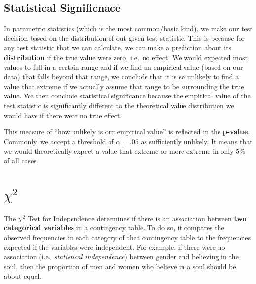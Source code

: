 \documentclass[
]{book}
\newenvironment{Shaded}{\begin{snugshade}}{\end{snugshade}}
\newcommand{\DecValTok}[1]{\textcolor[rgb]{0.00,0.00,0.81}{#1}}
\newcommand{\FunctionTok}[1]{\textcolor[rgb]{0.13,0.29,0.53}{\textbf{#1}}}
\newcommand{\NormalTok}[1]{#1}
\newcommand{\OtherTok}[1]{\textcolor[rgb]{0.56,0.35,0.01}{#1}}
\newcommand{\SpecialCharTok}[1]{\textcolor[rgb]{0.81,0.36,0.00}{\textbf{#1}}}
\newcommand{\StringTok}[1]{\textcolor[rgb]{0.31,0.60,0.02}{#1}}
\begin{document}
\begin{Shaded}
\end{Shaded}

\subsection{Statistical Significnace}\label{statistical-significnace}

In parametric statistics (which is the most common/basic kind), we make our test decision based on the distribution of out given test statistic.
This is because for any test statistic that we can calculate, we can make a prediction about its \textbf{distribution} if the true value were zero, i.e.~no effect.
We would expected most values to fall in a certain range and if we find an empirical value (based on our data) that falls beyond that range, we conclude that it is so unlikely to find a value that extreme if we actually assume that range to be surrounding the true value.
We then conclude statistical significance because the empirical value of the test statistic is significantly different to the theoretical value distribution we would have if there were no true effect.

This measure of ``how unlikely is our empirical value'' is reflected in the \textbf{p-value}.
Commonly, we accept a threshold of \(\alpha = .05\) as sufficiently unlikely.
It means that we would theoretically expect a value that extreme or more extreme in only 5\% of all cases.

\section{\texorpdfstring{\(\chi^2\)}{\textbackslash chi\^{}2}}\label{chi2}

The \(\chi^2\) Test for Independence determines if there is an association between \textbf{two categorical variables} in a contingency table.
To do so, it compares the observed frequencies in each category of that contingency table to the frequencies expected if the variables were independent.
For example, if there were no association (i.e.~\emph{statistical independence}) between gender and believing in the soul, then the proportion of men and women who believe in a soul should be about equal.
\end{document}
